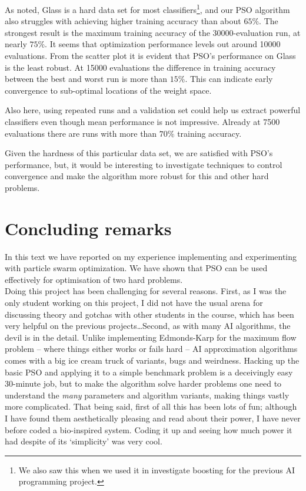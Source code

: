 \documentclass[a4paper,final,9pt]{article}
\begin{document}
\noindent
As noted, Glass is a hard data set for most classifiers\footnote{We also saw
this when we used it in investigate boosting for the previous AI programming
project.}, and our PSO algorithm also struggles with achieving higher training
accuracy than
about $65\%$. The strongest result is the maximum training accuracy of the
30000-evaluation run, at nearly $75\%$. It seems that optimization performance
levels out around 10000 evaluations. 
From the scatter plot it is evident that PSO's performance on Glass is the
least robust. At 15000 evaluations the difference in training
accuracy between the best and worst run is more than $15\%$. This can indicate
early convergence to sub-optimal locations of the weight space.

Also here, using repeated runs and a validation set could help us extract
powerful classifiers even though mean performance is not impressive. Already
at 7500 evaluations there are runs with more than $70\%$ training accuracy. 

Given the hardness of this particular data set, we are satisfied with PSO's
performance, but, it would be interesting to investigate techniques to control
convergence and make the algorithm more robust for this and other hard
problems.


\section{Concluding remarks}
\label{sec:conc}
In this text we have reported on my experience implementing and experimenting
with particle swarm optimization. We have shown that PSO can be used
effectively for optimisation of two hard problems.
\ \\

\noindent
Doing this project has been challenging for several reasons. First, as I was
the only student working on this project, I did not have the usual arena for
discussing theory and gotchas with other students in the course, which has
been very helpful on the previous projects\ldots Second, as with many AI
algorithms, the devil is in the detail. Unlike implementing Edmonds-Karp for
the maximum flow problem -- where things either works or fails hard --
AI approximation algorithms comes with a big ice cream truck of variants, bugs
and weirdness. Hacking up the basic PSO and applying it to a simple benchmark
problem is a deceivingly easy 30-minute job, but to make the algorithm solve
harder problems one need to understand the \emph{many} parameters and
algorithm variants, making things vastly more complicated.
That being said, first of all this has been lots of fun; although I have found
them aesthetically pleasing and read about their power, I have never before
coded a bio-inspired system. Coding it up and seeing how much power it had
despite of its `simplicity' was very cool.
\end{document}
